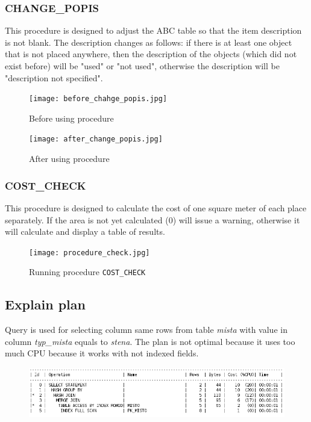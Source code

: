 \documentclass[12pt,a4paper]{article}
\begin{document}
\subsubsection{CHANGE\_POPIS}

This procedure is designed to adjust the ABC table so that the item description 
is not blank. The description changes as follows: if there is at least one 
object that is not placed anywhere, then the description of the objects (which 
did not exist before) will be "used" or "not used", otherwise the description 
will be "description not specified".

\begin{figure}[h!]
    \centering
    \texttt{[image: before\_chahge\_popis.jpg]}
    \caption{Before using procedure}

    \texttt{[image: after\_change\_popis.jpg]}
    \caption{After using procedure}
\end{figure}
\newpage
\subsubsection{COST\_CHECK}

This procedure is designed to calculate the cost of one square meter of each 
place separately. If the area is not yet calculated (0) will issue a warning, 
otherwise it will calculate and display a table of results.
\begin{figure}[h!]
    \centering
    \texttt{[image: procedure\_check.jpg]}
    \caption{Running procedure \texttt{COST\_CHECK}}
\end{figure}

\subsection{Explain plan}

Query is used for selecting column same rows from table \textit{mista} with value 
in column \textit{typ\_mista} equals to \textit{stena}. The plan is not 
optimal because it uses too much CPU because it works with not indexed fields.


\begin{figure}[h!]
    \centering
    \includegraphics[width=\textwidth,height=\textheight,keepaspectratio]
    {prev_explain_plan.png}
\end{figure}
\end{document}
